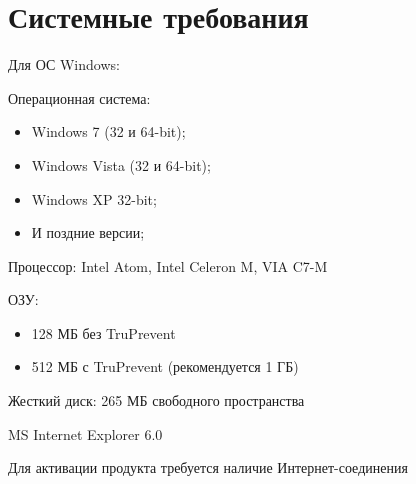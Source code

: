     \section{Системные требования}
        Для ОС Windows:\par
        Операционная система: 
        \begin{itemize}
    
            \item Windows 7 (32 и 64-bit);
            \item Windows Vista (32 и 64-bit);
            \item Windows XP 32-bit;
            \item И поздние версии;
        \end{itemize}
        Процессор: Intel Atom, Intel Celeron M, VIA C7-M\par
            ОЗУ: 
        \begin{itemize}
            \item 128 МБ без TruPrevent 
            \item 512 МБ с TruPrevent (рекомендуется 1 ГБ) 
        \end{itemize}
            Жесткий диск: 265 МБ свободного пространства\par
            MS Internet Explorer 6.0\par
            
            Для активации продукта требуется наличие Интернет-соединения\par
    \pagebreak

